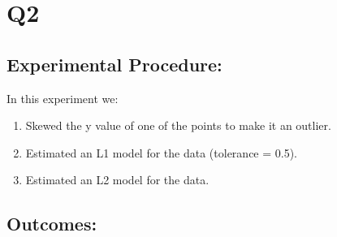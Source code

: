 \documentclass{article}
\begin{document}
\section{Q2}
\subsection{Experimental Procedure:}

In this experiment we:
\begin{enumerate}
    \item Skewed the y value of one of the points to make it an outlier.
    \item Estimated an L1 model for the data (tolerance = 0.5).
    \item Estimated an L2 model for the data.
\end{enumerate}

\subsection{Outcomes:}
\end{document}

